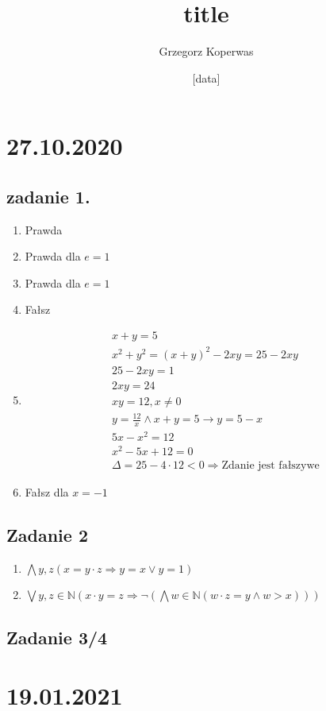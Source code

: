 \documentclass[a4paper,12pt]{article}
\title{title}
\author{Grzegorz Koperwas}
\date{[data]}
\begin{document}
\section{27.10.2020}

\subsection{zadanie 1.}
\begin{enumerate}
	\item Prawda
	\item Prawda dla $e = 1$
	\item Prawda dla $e = 1$
	\item Fałsz
	\item \begin{gather*}
		      x + y = 5 \\
		      x^2 + y^2 = (x + y)^2 - 2xy = 25 - 2xy\\
		      25 - 2xy = 1\\
		      2xy = 24 \\
		      xy = 12, x \not = 0 \\
		      y = \frac{12}{x} \wedge x + y = 5 \rightarrow y = 5 -x\\
		      5x - x^2 = 12\\
		      x^2 -5x + 12 =0 \\
		      \Delta = 25 - 4 \cdot 12 < 0 \Rightarrow \text{Zdanie jest fałszywe}
	      \end{gather*}
	\item Fałsz dla $x= -1$
\end{enumerate}

\subsection{Zadanie 2}
\begin{enumerate}
	\item $\bigwedge y, z \left(x = y \cdot z \Rightarrow y = x \vee y = 1\right)$
	\item $\bigvee y, z \in \mathbb{N} \left(x \cdot y = z \Rightarrow \neg \left(\bigwedge w \in \mathbb{N} \left(w \cdot z = y \wedge w > x\right)\right)\right)$
\end{enumerate}

\subsection{Zadanie 3/4}


\clearpage
\section{19.01.2021}
\end{document}
